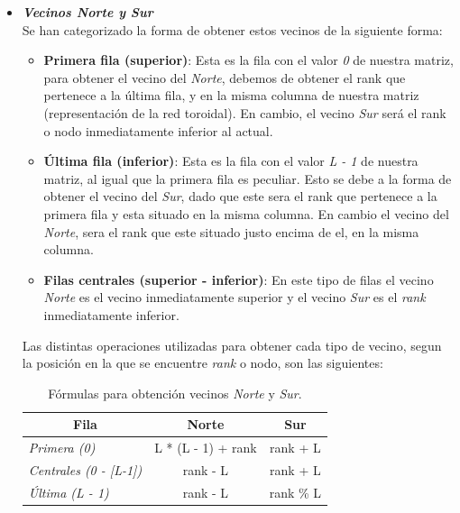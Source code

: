 \documentclass[11pt]{article}
\begin{document}
\begin{itemize}
	\item \textit{\textbf{Vecinos Norte y Sur}}
	\\Se han categorizado la forma de obtener estos vecinos de la siguiente forma:
	\begin{itemize}
		\item \textbf{Primera fila (superior)}: Esta es la fila con el valor \textit{0} de nuestra matriz, para obtener el vecino del \textit{Norte}, debemos de obtener el rank que pertenece a la última fila, y en la misma columna de nuestra matriz (representación de la red toroidal). En cambio, el vecino \textit{Sur} será el rank o nodo inmediatamente inferior al actual.
		
		\item \textbf{Última fila (inferior)}: Esta es la fila con el valor \textit{L - 1} de nuestra matriz, al igual que la primera fila es peculiar. Esto se debe a la forma de obtener el vecino del \textit{Sur}, dado que este sera el rank que pertenece a la primera fila y esta situado en la misma columna. En cambio el vecino del \textit{Norte}, sera el rank que este situado justo encima de el, en la misma columna.
		
		\item \textbf{Filas centrales (superior - inferior)}: En este tipo de filas el vecino \textit{Norte} es el vecino inmediatamente superior y el vecino \textit{Sur} es el \textit{rank} inmediatamente inferior.
	\end{itemize}

Las distintas operaciones utilizadas para obtener cada tipo de vecino, segun la posición en la que se encuentre \textit{rank} o nodo, son las siguientes:
\\

\begin{table}[H]
\centering
\begin{tabular}{|l|c|c|}
\hline
\multicolumn{1}{|c|}{\textbf{Fila}} & \textbf{Norte}     & \textbf{Sur} \\ \hline
\textit{Primera (0)}                & L * (L - 1) + rank & rank + L     \\ \hline
\textit{Centrales (0 - {[}L-1{]})}  & rank - L           & rank + L     \\ \hline
\textit{Última (L - 1)}             & rank - L           & rank \% L    \\ \hline
\end{tabular}
\caption{Fórmulas para obtención vecinos \textit{Norte} y \textit{Sur}.}
\label{tab:filas}
\end{table}



\end{itemize}
\end{document}
